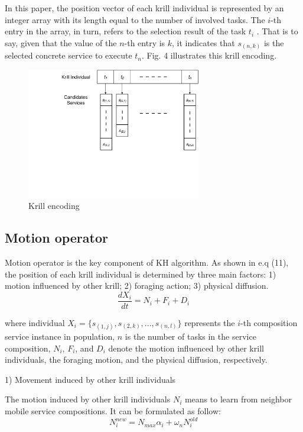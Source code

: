 \documentclass[journal]{IEEEtran}
\begin{document}
In this paper, the position vector of each krill individual is represented by an integer array with its length equal to the number of involved tasks. The $i$-th entry in the array, in turn, refers to the selection result of the task $t_i$ . That is to say, given that the value of the $n$-th entry is $k$, it indicates that $s_{(n,k)}$ is the selected concrete service to execute $t_n$. Fig. 4 illustrates this krill encoding.

\begin{figure}[!t]
\centering
\includegraphics[width=3in]{./img/pic4.pdf}
\caption{Krill encoding}
\label{Krill encoding}
\end{figure}


\subsection{Motion operator}
% 
% 

Motion operator is the key component of KH algorithm. As shown in e.q (11), the position of each krill individual is determined by three main factors: 1) motion influenced by other krill; 2) foraging action; 3) physical diffusion. 
\begin{equation}
\frac{dX_i}{dt} =N_i+F_i+D_i
\end{equation}

where individual $X_i = \{s_{(1,j)}, s_{(2,k)}, . . . , s_{(n,l)}\}$ represents the $i$-th composition service instance in population, $n$ is the number of tasks in the service composition, $N_i$, $F_i$, and $D_i$ denote the motion influenced by other krill individuals, the foraging motion, and the physical diffusion, respectively.

1) Movement induced by other krill individuals

The motion induced by other krill individuals $N_i$ means to learn from neighbor mobile service compositions. It can be formulated as follow:
\begin{equation}
N^{new}_i = N_{max}\alpha_i + \omega_n N^{old}_i
\end{equation}
\end{document}
